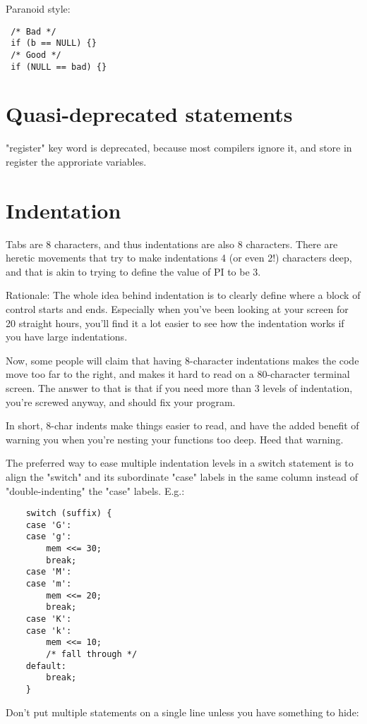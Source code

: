 \documentclass[pdftex,12pt, twocol]{article} %
\begin{document}
Paranoid style:
\begin{verbatim}
 /* Bad */
 if (b == NULL) {}
 /* Good */
 if (NULL == bad) {}
\end{verbatim}


\section{Quasi-deprecated statements}

"register" key word is deprecated, because most compilers ignore it, and
store in register the approriate variables.

\section{Indentation}

Tabs are 8 characters, and thus indentations are also 8 characters.
There are heretic movements that try to make indentations 4 (or even 2!)
characters deep, and that is akin to trying to define the value of PI to
be 3.

Rationale: The whole idea behind indentation is to clearly define where
a block of control starts and ends.  Especially when you've been looking
at your screen for 20 straight hours, you'll find it a lot easier to see
how the indentation works if you have large indentations.

Now, some people will claim that having 8-character indentations makes
the code move too far to the right, and makes it hard to read on a
80-character terminal screen.  The answer to that is that if you need
more than 3 levels of indentation, you're screwed anyway, and should fix
your program.

In short, 8-char indents make things easier to read, and have the added
benefit of warning you when you're nesting your functions too deep.
Heed that warning.

The preferred way to ease multiple indentation levels in a switch statement is
to align the "switch" and its subordinate "case" labels in the same column
instead of "double-indenting" the "case" labels.  E.g.:

\begin{verbatim}
	switch (suffix) {
	case 'G':
	case 'g':
		mem <<= 30;
		break;
	case 'M':
	case 'm':
		mem <<= 20;
		break;
	case 'K':
	case 'k':
		mem <<= 10;
		/* fall through */
	default:
		break;
	}
\end{verbatim}

Don't put multiple statements on a single line unless you have
something to hide:
\end{document}
